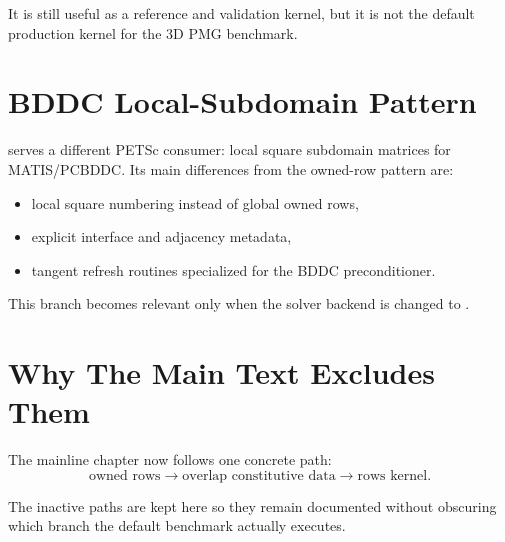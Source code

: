 It is still useful as a reference and validation kernel, but it is not the
default production kernel for the 3D PMG benchmark.

\section{BDDC Local-Subdomain Pattern}

 serves a different PETSc consumer: local square
subdomain matrices for MATIS/PCBDDC. Its main differences from the owned-row
pattern are:
\begin{itemize}
\item local square numbering instead of global owned rows,
\item explicit interface and adjacency metadata,
\item tangent refresh routines specialized for the BDDC preconditioner.
\end{itemize}

This branch becomes relevant only when the solver backend is changed to
.

\section{Why The Main Text Excludes Them}

The mainline chapter now follows one concrete path:
\[
\text{owned rows} \rightarrow \text{overlap constitutive data} \rightarrow
\text{rows kernel}.
\]

The inactive paths are kept here so they remain documented without obscuring
which branch the default benchmark actually executes.
